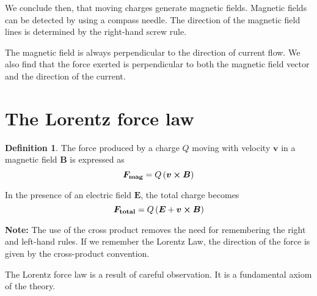 \documentclass[12pt,chapterprefix=false,dvipsnames]{scrbook}
\theoremstyle{dotless}
\theoremstyle{definition}
\newtheorem{protodefinition}{Definition}[section]
\newenvironment{definition}
{\colorlet{shadecolor}{black!15}\begin{shaded}\begin{protodefinition}}
			{\end{protodefinition}\end{shaded}}
\begin{document}
We conclude then, that moving charges generate magnetic fields.
Magnetic fields can be detected by using a compass needle. The
direction of the magnetic field lines is determined by the
right-hand screw rule.

The magnetic field is always perpendicular to the direction of
current flow. We also find that the force exerted is
perpendicular to both the magnetic field vector and the
direction of the current.

\section{The Lorentz force law}%
\label{sec:the_lorentz_force_law}

\begin{definition}

	The force produced by a charge $Q$ moving
	with velocity $\bm{v}$ in a magnetic field
	$\bm{B}$ is expressed as
	\begin{equation}
		\bm{F_{\mathrm{mag}}}
		=
		Q\left(\bm{v}\cross\bm{B}\right)
	\end{equation}

	In the presence of an electric field $\bm{E}$,
	the total charge becomes
	\begin{equation}
		\label{eq:the_lorentz_force_law}
		\bm{F_{\mathrm{total}}}
		=
		Q\left(\bm{E} + \bm{v}\cross\bm{B}\right)
	\end{equation}
\end{definition}

\textbf{Note:} The use of the cross product removes
the need for remembering the right and left-hand rules. If we
remember the Lorentz Law, the direction of the force is given by
the cross-product convention.

The Lorentz force law is a result of careful observation. It is
a fundamental axiom of the theory.
\end{document}
